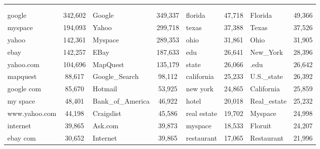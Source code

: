 \begin{figure}[t]
	\footnotesize
	\centering
\begin{tabular}{lc|lc|lc|lc}
\toprule
\multicolumn{4}{c}{\head{}} & \multicolumn{4}{c}{\tail{}}\\
\multicolumn{2}{c}{\shead{}} & \multicolumn{2}{c}{\ehead{}} & \multicolumn{2}{c}{\stail{}} & \multicolumn{2}{c}{\etail{}}\\
\midrule
google         & 342,602  &  Google  		   & 349,337  &  florida 	 &	47,718	&	Florida 		& 49,366 \\
myspace        & 194,093  &  Yahoo\!  		   & 299,718  &  texas  	 &	 37,388  &   Texas   		& 37,526 \\
yahoo          & 142,361  &  Myspace 		   & 289,353  &  ohio    	 &	31,861   &   Ohio    		& 31,905 \\			
ebay           & 142,257  &   EBay   		   & 187,633  &  edu     	 &	26,641   &   New\_York        & 28,396 \\
yahoo.com      & 104,696  &  MapQuest          & 135,179  &  state   	 &	26,066   &   .edu    		& 26,642 \\
mapquest       & 88,617   &  Google\_Search     & 98,112   &  california  &   25,233  &   U.S.\_state      & 26,392 \\
google com     & 85,670   &  Hotmail           & 53,925   &  new york    &   24,865  &   California      & 25,859 \\
my space       & 48,401   &	  Bank\_of\_America  & 46,922   &  hotel   	 &	20,018   &   Real\_estate     & 25,232 \\
www.yahoo.com  & 44,198   &  Craigslist        & 45,586   &  real estate &   19,702  &   Myspace 		& 24,998 \\
internet       & 39,865   &  Ask.com           & 39,873   &  myspace 	 &	18,533   &   Floruit 		& 24,207 \\
ebay com       & 30,652   &  Internet          & 39,865   &  restaurant  &  17,065   &   Restaurant      & 21,996 \\

\end{tabular}
\end{figure}
